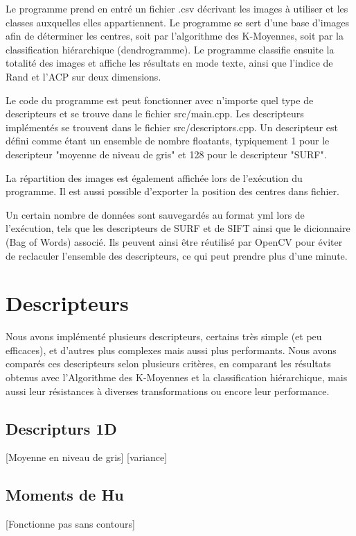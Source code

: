 \documentclass[12pt,a4paper,utf8x]{report}
\begin{document}
    Le programme prend en entré un fichier .csv décrivant les images à utiliser et les classes auxquelles elles appartiennent. Le programme se sert d'une base d'images afin de déterminer les centres, soit par l'algorithme des K-Moyennes, soit par la classification hiérarchique (dendrogramme). Le programme classifie ensuite la totalité des images et affiche les résultats en mode texte, ainsi que l'indice de Rand et l'ACP sur deux dimensions.

    Le code du programme est peut fonctionner avec n'importe quel type de descripteurs et se trouve dans le fichier src/main.cpp. Les descripteurs implémentés se trouvent dans le fichier src/descriptors.cpp. Un descripteur est défini comme étant un ensemble de nombre floatants, typiquement 1 pour le descripteur "moyenne de niveau de gris" et 128 pour le descripteur "SURF".

    La répartition des images est également affichée lors de l'exécution du programme. Il est aussi possible d'exporter la position des centres dans fichier.

    Un certain nombre de données sont sauvegardés au format yml lors de l'exécution, tels que les descripteurs de SURF et de SIFT ainsi que le dicionnaire (Bag of Words) associé. Ils peuvent ainsi être réutilisé par OpenCV pour éviter de reclaculer l'ensemble des descripteurs, ce qui peut prendre plus d'une minute.


\chapter{Descripteurs}
    Nous avons implémenté plusieurs descripteurs, certains très simple (et peu efficaces), et d'autres plus complexes mais aussi plus performants. Nous avons comparés ces descripteurs selon plusieurs critères, en comparant les résultats obtenus avec l'Algorithme des K-Moyennes et la classification hiérarchique, mais aussi leur résistances à diverses transformations ou encore leur performance.

    \section{Descripturs 1D}
        [Moyenne en niveau de gris]
        [variance]

    \section{Moments de Hu}
        [Fonctionne pas sans contours]
\end{document}
